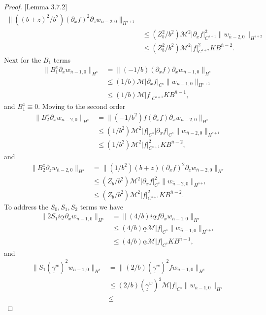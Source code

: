 \begin{proof}{[Lemma 3.7.2]}
\begin{align*}
\|((b+z)^2/b^2)(\partial_x f)^2\partial_z w_{\overline{n}-2,0}\|_{H^{s+1}}\\&\le
(Z_b^2/b^2)\mathcal{M}^2|\partial_x f|_{C^{s+1}}^2\|w_{\overline{n}-2, 0}\|_{H^{s+2}} \\&\le
(Z_b^2/b^2)\mathcal{M}^2|f|_{C^{s+2}}^2KB^{\overline{n}-2}.
\end{align*}
Next for the $B_1$ terms
\begin{align*}
\|B_1^{x}\partial_x w_{\overline{n}-1,0}\|_{H^{s}} &= 
\|(-1/b)(\partial_x f)\partial_x w_{\overline{n}-1,0}\|_{H^{s}}\\&\le
(1/b)\mathcal{M}|\partial_x f|_{C^{s}}\|w_{\overline{n}-1, 0}\|_{H^{s+1}} \\&\le
(1/b)\mathcal{M}|f|_{C^{s+1}}KB^{\overline{n}-1},
\end{align*}
and $B_1^z\equiv 0$. Moving to the second order
\begin{align*}
\|B_2^{x}\partial_x w_{\overline{n}-2,0}\|_{H^{s}} &= 
\|(-1/b^2)f(\partial_x f)\partial_x w_{\overline{n}-2,0}\|_{H^{s}}\\&\le
(1/b^2)\mathcal{M}^2|f|_{C^{s}}|\partial_x f|_{C^{s}}\|w_{\overline{n}-2, 0}\|_{H^{s+1}} \\&\le
(1/b^2)\mathcal{M}^2|f|_{C^{s+1}}^2KB^{\overline{n}-2},
\end{align*}
and
\begin{align*}
\|B_2^{z}\partial_z w_{\overline{n}-2,0}\|_{H^{s}} &= 
\|(1/b^2)(b+z)(\partial_x f)^2\partial_z w_{\overline{n}-2,0}\|_{H^{s}}\\&\le
(Z_b/b^2)\mathcal{M}^2|\partial_x f|_{C^{s}}^2\|w_{\overline{n}-2, 0}\|_{H^{s+1}} \\&\le
(Z_b/b^2)\mathcal{M}^2|f|_{C^{s+1}}^2KB^{\overline{n}-2}.
\end{align*}
To address the $S_0,S_1,S_2$ terms we have
\begin{align*}
\|2S_1i\underline{\alpha}\partial_xw_{\overline{n}-1,0}\|_{H^{s}}&=\|(4/b)i\underline{\alpha}f\partial_xw_{\overline{n}-1,0}\|_{H^{s}}\\&\le
(4/b)\underline{\alpha}\mathcal{M}|f|_{C^{s}}\|w_{\overline{n}-1, 0}\|_{H^{s+1}}\\&\le
(4/b)\underline{\alpha}\mathcal{M}|f|_{C^{s}}KB^{\overline{n}-1},
\end{align*}
and
\begin{align*}
\|S_1(\underline{\gamma}^w)^2w_{\overline{n}-1,0}\|_{H^{s}}&=\|(2/b)(\underline{\gamma}^w)^2fw_{\overline{n}-1,0}\|_{H^{s}}\\&\le
(2/b)(\underline{\gamma}^w)^2\mathcal{M}|f|_{C^{s}}\|w_{\overline{n}-1, 0}\|_{H^{s}}\\&\le

\end{align*}
\end{proof}
